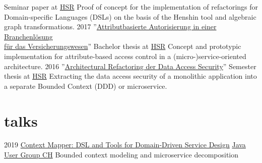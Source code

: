 \documentclass[]{cv-style}
\begin{document}
\begin{entrylist}
{Seminar paper at \href{https://www.hsr.ch}{HSR}}
{Proof of concept for the implementation of refactorings for Domain-specific Languages (DSLs) on the basis of the Henshin tool and algebraic graph transformations.}
\entry
{2017}
{''\href{https://eprints.hsr.ch/602/}{Attributbasierte Autorisierung in einer Branchenlösung\\für das Versicherungswesen}''}
{Bachelor thesis at \href{https://www.hsr.ch}{HSR}}
{Concept and prototypic implementation for attribute-based access control in a (micro-)service-oriented architecture.}
\entry
{2016}
{''\href{https://eprints.hsr.ch/564/}{Architectural Refactoring der Data Access Security}''}
{Semester thesis at \href{https://www.hsr.ch}{HSR}}
{Extracting the data access security of a monolithic application into a separate Bounded Context (DDD) or microservice.}
\end{entrylist}


\section{talks}

\begin{entrylist}
\entry
{2019}
{\href{https://www.jug.ch/html/events/2019/context_mapper.html}{Context Mapper: DSL and Tools for Domain-Driven Service Design}}
{\href{https://www.jug.ch/}{Java User Group CH}}
{Bounded context modeling and microservice decomposition}
\end{entrylist}
\end{document}
